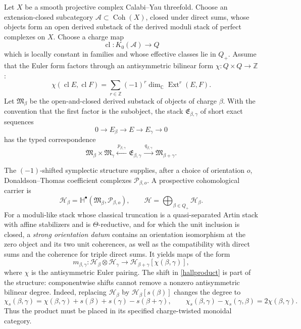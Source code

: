 \documentclass[11pt]{article}
\begin{document}
Let $X$ be a smooth projective complex Calabi--Yau threefold.  Choose an
extension-closed subcategory $\mathcal A\subset\operatorname{Coh}(X)$,
closed under direct sums, whose objects form an open derived substack of
the derived moduli stack of perfect complexes on $X$.  Choose a charge map
\[
 \operatorname{cl}:K_0(\mathcal A)\longrightarrow Q
\]
which is locally constant in families and whose effective classes lie in
$Q_+$.  Assume that the Euler form factors through an antisymmetric
bilinear form $\chi:Q\times Q\to\mathbb Z$:
\[
 \chi(\operatorname{cl}E,\operatorname{cl}F)
 =\sum_{r\in\mathbb Z}(-1)^r
   \dim_{\mathbb C}\operatorname{Ext}^r(E,F).
\]
Let $\mathfrak M_\beta$ be the open-and-closed derived substack of objects
of charge $\beta$.  With the convention that the first factor is the
subobject, the stack
$\mathfrak E_{\beta,\gamma}$ of short exact sequences
\[
 0\longrightarrow E_\beta\longrightarrow E
  \longrightarrow E_\gamma\longrightarrow0
\]
has the typed correspondence
\begin{equation}
 \mathfrak M_\beta\times\mathfrak M_\gamma
 \xleftarrow{\ p_{\beta,\gamma}\ }
 \mathfrak E_{\beta,\gamma}
 \xrightarrow{\ q_{\beta,\gamma}\ }
 \mathfrak M_{\beta+\gamma}.                                 \label{hallcorr}
\end{equation}

The $(-1)$-shifted symplectic structure supplies, after a choice of
orientation $o$, Donaldson--Thomas coefficient complexes
$\mathcal P_{\beta,o}$.  A prospective cohomological carrier is
\begin{equation}
 \mathcal H_\beta
   =\mathbb H^\bullet(\mathfrak M_\beta,\mathcal P_{\beta,o}),
 \qquad
 \mathcal H=\bigoplus_{\beta\in Q_+}\mathcal H_\beta.         \label{hallcarrier}
\end{equation}
For a moduli-like stack whose classical truncation is a quasi-separated
Artin stack with affine stabilizers and is $\Theta$-reductive, and for which
the unit inclusion is closed, a \emph{strong orientation datum} contains an
orientation isomorphism at the zero object and its two unit coherences, as
well as the compatibility with direct sums and the coherence for triple
direct sums.  It yields maps of the form
\begin{equation}
 m_{\beta,\gamma}:
 \mathcal H_\beta\otimes\mathcal H_\gamma
 \longrightarrow
 \mathcal H_{\beta+\gamma}[\chi(\beta,\gamma)],               \label{hallproduct}
\end{equation}
where $\chi$ is the antisymmetric Euler pairing.  The shift in
\eqref{hallproduct} is part of the structure: componentwise shifts cannot
remove a nonzero antisymmetric bilinear degree.  Indeed, replacing
$\mathcal H_\beta$ by $\mathcal H_\beta[s(\beta)]$ changes the degree to
\[
 \chi_s(\beta,\gamma)=\chi(\beta,\gamma)+s(\beta)+s(\gamma)
 -s(\beta+\gamma),\qquad
 \chi_s(\beta,\gamma)-\chi_s(\gamma,\beta)=2\chi(\beta,\gamma).
\]
Thus the product must be placed in its specified charge-twisted monoidal
category.
\end{document}
